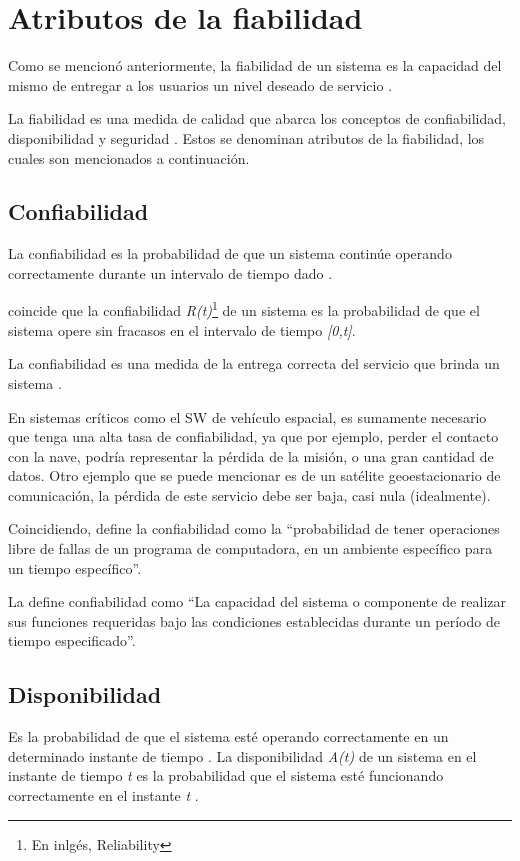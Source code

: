 \section{Atributos de la fiabilidad}\label{sec:atributos_de_la_fiabilidad}
Como se mencionó anteriormente, la fiabilidad de un sistema es la capacidad del mismo de entregar a los usuarios un nivel
deseado de servicio \citep{FTDesign}.

La fiabilidad es una medida de calidad  que abarca los conceptos de confiabilidad, disponibilidad y seguridad \citep{SoftwareFaultToleranceATutorial}. Estos se denominan atributos de la fiabilidad, los cuales son mencionados a continuación.

\subsection{Confiabilidad}\label{subsec:confiabilidad}
La confiabilidad es la probabilidad de que un sistema continúe operando correctamente durante un
intervalo de tiempo dado \citep{SoftwareFaultToleranceATutorial}.

\cite{FTDesign} coincide que la confiabilidad \textit{R(t)}\footnote{En inlgés, Reliability} de un
sistema es la probabilidad de que el sistema opere sin fracasos en el intervalo de tiempo
\textit{[0,t]}.

La confiabilidad es una medida de la entrega correcta del servicio que brinda un sistema
\citep{FTDesign}.

En sistemas críticos como el \ac{SW} de vehículo espacial, es sumamente necesario que tenga una
alta tasa de confiabilidad, ya que por ejemplo, perder el contacto con la nave, podría representar
la pérdida de la misión, o una gran cantidad de datos. Otro ejemplo que se puede mencionar es de un
satélite geoestacionario de comunicación, la pérdida de este servicio debe ser baja, casi nula
(idealmente).

Coincidiendo, \cite{pressman01} define la confiabilidad como la ``probabilidad de tener operaciones
libre de fallas de un programa de computadora, en un ambiente específico para un tiempo específico''. 

La \cite{IEEE610.12} define confiabilidad como ``La capacidad del sistema o componente de realizar
sus funciones requeridas bajo las condiciones establecidas durante un período de tiempo
especificado''.

\subsection{Disponibilidad}\label{subsec:disponibilidad}
Es la probabilidad de que el sistema esté operando correctamente en un determinado instante de
tiempo \citep{SoftwareFaultToleranceATutorial}. La disponibilidad \textit{A(t)} de un sistema en el
instante de tiempo \textit{t} es la probabilidad que el sistema esté funcionando correctamente en
el instante \textit{t} \citep{FTDesign}.

